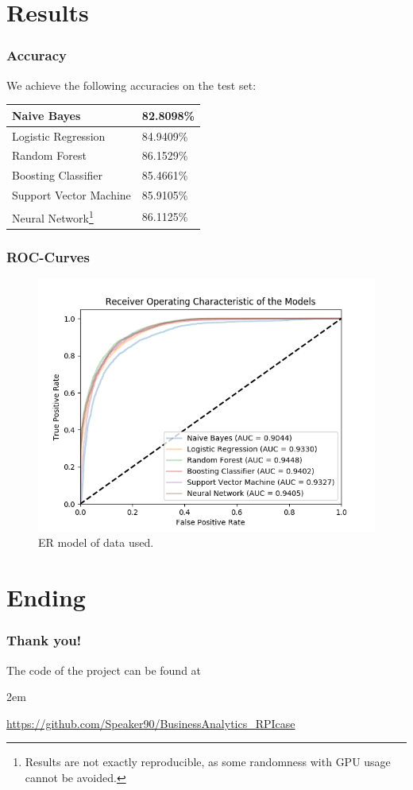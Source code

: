 \documentclass[xcolor=sgvnames,serifs,notes,compress,professionalfont]{beamer}
\begin{document}
\section{Results}
\begin{frame}
\frametitle{Accuracy}
We achieve the following accuracies on the test set:
\begin{table}
	\begin{tabular}{|l|l|}
		\hline
		Naive Bayes & 82.8098\%\\\hline
		Logistic Regression & 84.9409\%\\\hline
		Random Forest & 86.1529\%\\\hline
		Boosting Classifier & 85.4661\%\\\hline
		Support Vector Machine &  85.9105\%\\\hline
		Neural Network\footnote{Results are not exactly reproducible, as some randomness with GPU usage cannot be avoided.} & 86.1125\%\\
		\hline 
	\end{tabular}
\end{table}
\end{frame}

\begin{frame}
\frametitle{ROC-Curves}
\begin{figure}
	\includegraphics[height=0.75\textheight]{pictures/rocs.png}    
	\caption{ER model of data used.}
\end{figure}
\end{frame}

\section{Ending}
\begin{frame}
\frametitle{Thank you!}
\begin{center}
	The code of the project can be found at
\end{center}
	\kern 2em
\begin{center}
	\url{https://github.com/Speaker90/BusinessAnalytics_RPIcase}
\end{center}
\end{frame}
\end{document}
